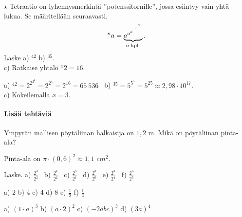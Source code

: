 \begin{tehtavasivu}
\begin{tehtava}
$\star$ Tetraatio on lyhennysmerkintä ''potenssitornille'',
jossa esiintyy vain yhtä lukua. Se määritellään seuraavasti.
\[^na = \underbrace{{a^{a^{a^{\mathstrut^{.^{.^{.^{a}}}}}}}}}_{n\textrm{ kpl }}. \]
Laske \quad a) $^42$  \quad b) $^35$. \\ c) Ratkaise yhtälö $^x2= 16$.
\begin{vastaus}
a) $^42 = 2^{2^{2^2}}=2^{2^4}=2^{16}=65\ 536$ \
b) $^35 = 5^{5^5} = 5^{25} \approx 2,98 \cdot 10^{17}$. \\
c) Kokeilemalla $x =3$.
\end{vastaus}
\end{tehtava}

\paragraph*{Lisää tehtäviä}

    \begin{tehtava}
        Ympyrän mallisen pöytäliinan halkaisija on $1{,}2$ m. Mikä on pöytäliinan pinta-ala?
       
        \begin{vastaus}
        Pinta-ala on $\pi \cdot (0{,}6)^2 \approx 1,1$ $cm^2$.
        \end{vastaus}
\end{tehtava}

\begin{tehtava}
        Laske. \quad
        a) $\displaystyle \frac{2^3}{2^2}$ \quad \
        b) $\displaystyle \frac{2^4}{2^2}$ \quad \
        c) $\displaystyle \frac{2^3}{2^1}$ \quad \
        d) $\displaystyle \frac{2^3}{2^0}$ \quad \
        e) $\displaystyle \frac{2^3}{2^4}$ \quad \
        f) $\displaystyle \frac{2^3}{2^5}$
        
        \begin{vastaus}
            a) $2$ \qquad
            b) $4$ \qquad
            c) $4$ \qquad
            d) $8$ \qquad
            e) $\frac{1}{2}$ \qquad
            f) $\frac{1}{4}$
        \end{vastaus}
    \end{tehtava}


 \begin{tehtava}
        a) $(1\cdot a)^3$ \qquad
        b) $(a\cdot 2)^2$ \qquad
        c) $(-2abc)^3$ \qquad
        d) $(3a)^4$


\end{tehtava}
\end{tehtavasivu}
